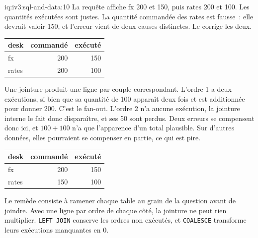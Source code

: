 \begin{solution}{iq:iv3:sql-and-data:10}
La requête affiche fx 200 et 150, puis rates 200 et 100. Les quantités exécutées sont justes. La quantité commandée des rates est fausse~: elle devrait valoir 150, et l'erreur vient de deux causes distinctes. Le  corrige les deux.
\begin{center}\small
\begin{tabular}{lrr}
desk & commandé & exécuté\\\hline
fx & 200 & 150\\
rates & 200 & 100
\end{tabular}
\end{center}
Une jointure produit une ligne par couple correspondant. L'ordre 1 a deux exécutions, si bien que sa quantité de 100 apparaît deux fois et est additionnée pour donner 200. C'est le fan-out. L'ordre 2 n'a aucune exécution, la jointure interne le fait donc disparaître, et ses 50 sont perdus. Deux erreurs se compensent donc ici, et $100 + 100$ n'a que l'apparence d'un total plausible. Sur d'autres données, elles pourraient se compenser en partie, ce qui est pire.
\label{lst:iv3:sq:fanoutfixed}
\begin{center}\small
\begin{tabular}{lrr}
desk & commandé & exécuté\\\hline
fx & 200 & 150\\
rates & 150 & 100
\end{tabular}
\end{center}
Le remède consiste à ramener chaque table au grain de la question avant de joindre. Avec une ligne par ordre de chaque côté, la jointure ne peut rien multiplier. \texttt{LEFT JOIN} conserve les ordres non exécutés, et \texttt{COALESCE} transforme leurs exécutions manquantes en 0.

\end{solution}

